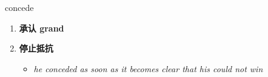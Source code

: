 
\begin{frame}
{\huge concede}
\begin{center}
\begin{enumerate}\Large
  \item \textbf{承认 grand}
  \item \textbf{停止抵抗}
  \begin{itemize}
    \item \em{\Large{he conceded as soon as it becomes clear that his could not win}}
  \end{itemize}
\end{enumerate}
\end{center}
\end{frame}
